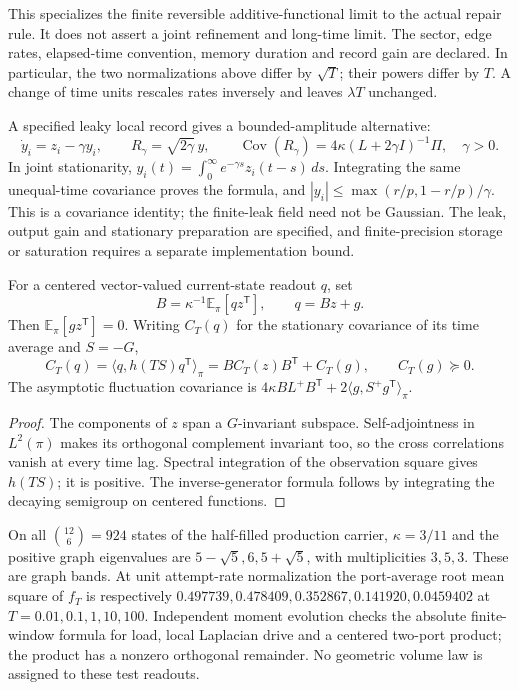 This specializes the finite reversible additive-functional limit
\cite{KipnisVaradhanNative} to the actual repair rule. It does not assert a joint refinement and long-time
limit. The sector, edge rates, elapsed-time convention, memory duration and
record gain are declared. In particular, the two normalizations above
differ by \(\sqrt T\); their powers differ by \(T\). A change of time
units rescales rates inversely and leaves \(\lambda T\) unchanged.

A specified leaky local record gives a bounded-amplitude alternative:
\[
 \dot y_i=z_i-\gamma y_i,\qquad R_\gamma=\sqrt{2\gamma}\,y,
 \qquad \operatorname{Cov}(R_\gamma)
   =4\kappa(L+2\gamma I)^{-1}\Pi,\quad \gamma>0.
\]
In joint stationarity, \(y_i(t)=\int_0^\infty e^{-\gamma s}z_i(t-s)\,ds\).
Integrating the same unequal-time covariance proves the formula, and
\(|y_i|\le\max(r/p,1-r/p)/\gamma\). This is a covariance identity;
the finite-leak field need not be Gaussian. The leak, output gain and
stationary preparation are specified, and finite-precision storage or
saturation requires a separate implementation bound.

\begin{theorem}
For a centered vector-valued current-state readout \(q\), set
\[
 B=\kappa^{-1}\mathbb E_\pi[qz^{\mathsf T}],\qquad q=Bz+g.
\]
Then \(\mathbb E_\pi[gz^{\mathsf T}]=0\). Writing \(C_T(q)\) for the
stationary covariance of its time average and \(S=-G\),
\[
 C_T(q)=\langle q,h(TS)q^{\mathsf T}\rangle_\pi
       =B C_T(z) B^{\mathsf T}+C_T(g),\qquad C_T(g)\succeq0.
\]
The asymptotic fluctuation covariance is
\(4\kappa BL^+B^{\mathsf T}+2\langle g,S^+g^{\mathsf T}\rangle_\pi\).
\end{theorem}
\begin{proof}
The components of \(z\) span a \(G\)-invariant subspace. Self-adjointness
in \(L^2(\pi)\) makes its orthogonal complement invariant too, so the
cross correlations vanish at every time lag. Spectral integration of the
observation square gives \(h(TS)\); it is positive. The inverse-generator
formula follows by integrating the decaying semigroup on centered functions.
\end{proof}

On all \(\binom{12}{6}=924\) states of the half-filled production carrier,
\(\kappa=3/11\) and the positive graph eigenvalues are
\(5-\sqrt5,6,5+\sqrt5\), with multiplicities \(3,5,3\).
These are graph bands. At unit attempt-rate normalization the port-average
root mean square of \(f_T\) is respectively
\(0.497739,0.478409,0.352867,0.141920,0.0459402\) at
\(T=0.01,0.1,1,10,100\). Independent moment evolution checks the
absolute finite-window formula for load, local Laplacian drive and a
centered two-port product; the product has a nonzero orthogonal remainder.
No geometric volume law is assigned to these test readouts.


